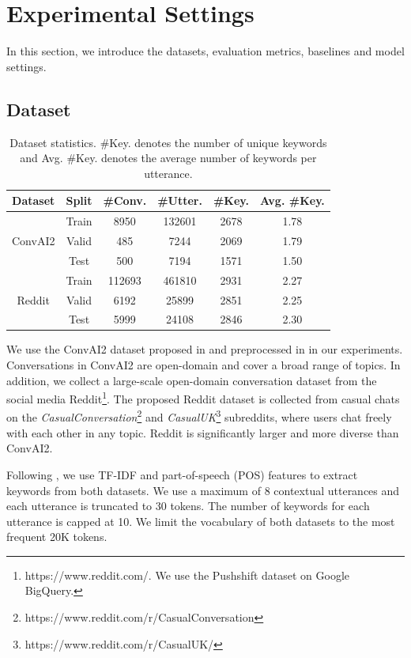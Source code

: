 \documentclass[letterpaper]{article} %
\begin{document}
\section{Experimental Settings}
\label{sec: experiments}
In this section, we introduce the datasets, evaluation metrics, baselines and model settings.
\subsection{Dataset}
\label{sec: dataset}
\begin{table}[!t]
\small
\centering
\begin{tabular}{cccccc}
\hline
\textbf{Dataset} & \textbf{Split} & \textbf{\#Conv.} & \textbf{\#Utter.} & \textbf{\#Key.} & \textbf{Avg. \#Key.}\\
\hline
\multirow{3}{*}{ConvAI2} & Train & 8950 & 132601 & 2678 & 1.78\\
 & Valid & 485 & 7244 & 2069 & 1.79\\
 & Test & 500 & 7194 & 1571 & 1.50\\
\hline
\multirow{3}{*}{Reddit} & Train & 112693 & 461810 & 2931 & 2.27\\
& Valid & 6192 & 25899 & 2851 & 2.25\\
& Test & 5999 & 24108 & 2846 & 2.30\\
\hline
\end{tabular}
\caption{Dataset statistics. \#Key. denotes the number of unique keywords and Avg. \#Key. denotes the average number of keywords per utterance.}
\label{table: dataset}
\end{table}
We use the ConvAI2 dataset proposed in \cite{zhang2018personalizing,dinan2019second} and preprocessed in \cite{tang2019target} in our experiments. Conversations in ConvAI2 are open-domain and cover a broad range of topics. In addition, we collect a large-scale open-domain conversation dataset from the social media Reddit\footnote{https://www.reddit.com/. We use the Pushshift dataset on Google BigQuery.}. The proposed Reddit dataset is collected from casual chats on the \textit{CasualConversation}\footnote{https://www.reddit.com/r/CasualConversation} and \textit{CasualUK}\footnote{https://www.reddit.com/r/CasualUK/} subreddits, where users chat freely with each other in any topic. Reddit is significantly larger and more diverse than ConvAI2.

Following \cite{tang2019target}, we use TF-IDF and part-of-speech (POS) features to extract keywords from both datasets. We use a maximum of 8 contextual utterances and each utterance is truncated to 30 tokens. The number of keywords for each utterance is capped at 10. We limit the vocabulary of both datasets to the most frequent 20K tokens.
\end{document}
